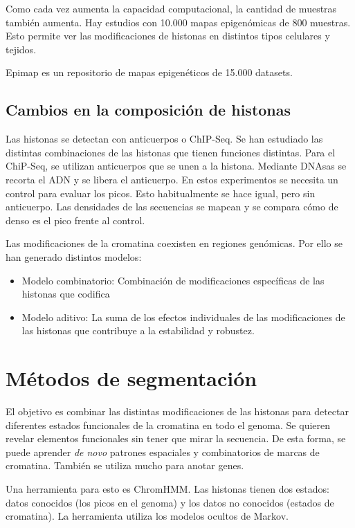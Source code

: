 Como cada vez aumenta la capacidad computacional, la cantidad de muestras también aumenta. Hay estudios con 10.000 mapas epigenómicas de 800 muestras. Esto permite ver las modificaciones de histonas en distintos tipos celulares y tejidos. 

Epimap es un repositorio de mapas epigenéticos de 15.000 datasets. 

\subsection{Cambios en la composición de histonas}
Las histonas se detectan con anticuerpos o ChIP-Seq. Se han estudiado las distintas combinaciones de las histonas que tienen funciones distintas. Para el ChiP-Seq, se utilizan anticuerpos que se unen a la histona. Mediante DNAsas se recorta el ADN y se libera el anticuerpo. En estos experimentos se necesita un control para evaluar los picos. Esto habitualmente se hace igual, pero sin anticuerpo. Las densidades de las secuencias se mapean y se compara cómo de denso es el pico frente al control. 

Las modificaciones de la cromatina coexisten en regiones genómicas. Por ello se han generado distintos modelos:
\begin{itemize}
\item Modelo combinatorio: Combinación de modificaciones específicas de las histonas que codifica
\item Modelo aditivo: La suma de los efectos individuales de las modificaciones de las histonas
que contribuye a la estabilidad y robustez.
\end{itemize}

\section{Métodos de segmentación}
El objetivo es combinar las distintas modificaciones de las histonas para detectar diferentes estados funcionales de la cromatina en todo el genoma. Se quieren revelar elementos funcionales sin tener que mirar la secuencia. De esta forma, se puede aprender \textit{de novo} patrones espaciales y combinatorios de marcas de cromatina. También se utiliza mucho para anotar genes. 

Una herramienta para esto es ChromHMM. Las histonas tienen dos estados: datos conocidos (los picos en el genoma) y los datos no conocidos (estados de cromatina). La herramienta utiliza los modelos ocultos de Markov.

